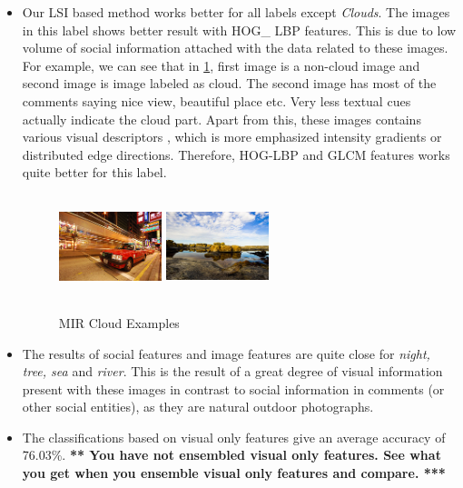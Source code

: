 \begin{itemize}
\item Our LSI based method works better for all labels except 
\textit{Clouds}. The images in this label shows better result with HOG\_ LBP features. This is due to low volume of social information attached with the data related to these images. For example, we can see that in \ref{fig:Image MIR Examples}, first image is a non-cloud image and second image is image labeled as cloud. The second image has most of the comments saying nice view, beautiful place etc. Very less textual cues actually indicate the cloud part. Apart from this, these images contains various visual descriptors , which is more emphasized intensity gradients or distributed edge directions. Therefore, HOG-LBP and GLCM features works quite better for this label.

\begin{center}
\begin{figure}
\centering
\includegraphics[width=3cm, height=3cm]{./Pictures/MIR/cloud_0.jpg}
\includegraphics[width=3cm, height=3cm]{./Pictures/MIR/cloud_1.jpg}
\caption{MIR Cloud Examples}
\label{fig:Image MIR Examples}
\end{figure}
\end{center}


\item The results of social features and image features are quite 
close for \textit{night, tree, sea} and \textit{river}. This is the 
result of a great degree of visual information present with these 
images in contrast to social information in comments (or other social 
entities), as they are natural outdoor photographs.

\item The classifications based on visual only features give an 
average accuracy of 76.03\%.
{\bf *** You have not ensembled visual only features. See what you
get when you ensemble visual only features and compare. ***}


\end{itemize}
